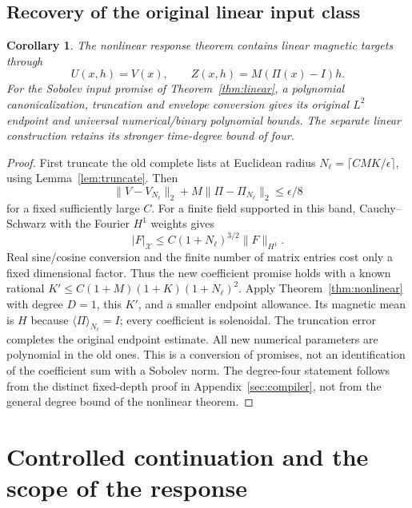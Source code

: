 \documentclass[11pt,a4paper]{amsart}
\newtheorem{corollary}[theorem]{Corollary}
\theoremstyle{definition}
\theoremstyle{remark}
\numberwithin{equation}{section}
\newcommand{\norm}[1]{\lVert #1\rVert}
\newcommand{\mean}[1]{\langle #1\rangle}
\begin{document}
\subsection{Recovery of the original linear input class}
\begin{corollary}\label{cor:linear-recovery}
The nonlinear response theorem contains linear magnetic targets through
\[
 U(x,h)=V(x),\qquad Z(x,h)=M(\Pi(x)-I)h.
\]
For the Sobolev input promise of Theorem~\ref{thm:linear}, a polynomial
canonicalization, truncation and envelope conversion gives its original
$L^2$ endpoint and universal numerical/binary polynomial bounds. The separate
linear construction retains its stronger time-degree bound of four.
\end{corollary}
\begin{proof}
First truncate the old complete lists at Euclidean radius
$N_\ell=\lceil C M K/\epsilon\rceil$, using Lemma~\ref{lem:truncate}.
Then
\[
 \norm{V-V_{N_\ell}}_2+
 M\norm{\Pi-\Pi_{N_\ell}}_2\le\epsilon/8
\]
for a fixed sufficiently large $C$. For a finite field supported in this
band, Cauchy--Schwarz with the Fourier $H^1$ weights gives
\[
 |F|_{\mathcal X}\le C(1+N_\ell)^{3/2}\norm F_{H^1}.
\]
Real sine/cosine conversion and the finite number of matrix entries cost
only a fixed dimensional factor. Thus the new coefficient promise holds
with a known rational
$K'\le C(1+M)(1+K)(1+N_\ell)^2$. Apply
Theorem~\ref{thm:nonlinear} with degree $D=1$, this $K'$, and a smaller
endpoint allowance. Its magnetic mean is $H$ because
$\mean\Pi_{N_\ell}=I$; every coefficient is solenoidal. The truncation
error completes the original endpoint estimate. All new numerical
parameters are polynomial in the old ones. This is a conversion of promises,
not an identification of the coefficient sum with a Sobolev norm.
The degree-four statement follows from the distinct fixed-depth proof in
Appendix~\ref{sec:compiler}, not from the general degree bound of the
nonlinear theorem.
\end{proof}

\section{Controlled continuation and the scope of the response}\label{sec:scope}
\end{document}

